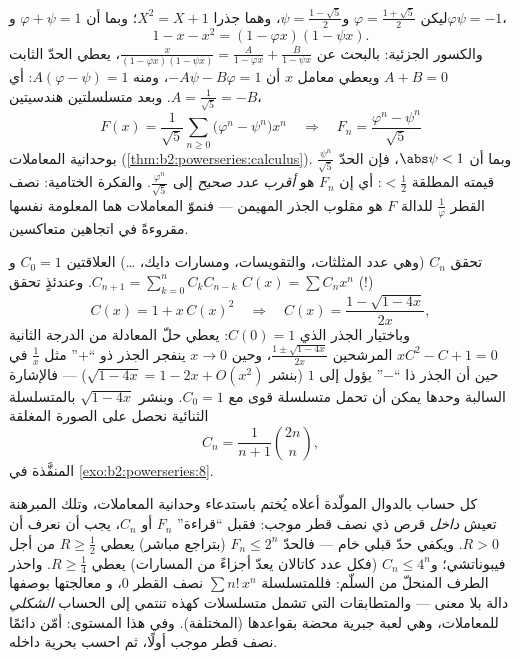 \begin{example}\label{ex:b2:powerseries:binet}
ليكن $\varphi = \frac{1+\sqrt5}{2}$ و$\psi =
\frac{1-\sqrt5}{2}$، وهما جذرا $X^2 = X + 1$؛ وبما أن $\varphi
+ \psi = 1$ و$\varphi\psi = -1$،
\[
1 - x - x^2 = (1 - \varphi x)(1 - \psi x) .
\]
والكسور الجزئية: بالبحث عن $\frac{x}{(1-\varphi x)(1-\psi x)} =
\frac{A}{1 - \varphi x} + \frac{B}{1 - \psi x}$، يعطي الحدّ
الثابت $A + B = 0$ ويعطي معامل $x$ أن $-A\psi - B\varphi
= 1$، ومنه $A(\varphi - \psi) = 1$: أي $A = \frac{1}{\sqrt5} = -B$.
وبعد متسلسلتين هندسيتين،
\[
F(x) = \frac{1}{\sqrt5}\sum_{n\geq0}
\bigl(\varphi^n - \psi^n\bigr)x^n
\quad\Longrightarrow\quad
F_n = \frac{\varphi^n - \psi^n}{\sqrt5}
\]
بوحدانية المعاملات
(\cref{thm:b2:powerseries:calculus}). وبما أن $\abs\psi < 1$، فإن
الحدّ $\frac{\psi^n}{\sqrt5}$ قيمته المطلقة $< \frac12$:
أي إن $F_n$ هو \emph{أقرب عدد صحيح} إلى
$\frac{\varphi^n}{\sqrt5}$. والفكرة الختامية: نصف القطر
$\frac1\varphi$ للدالة $F$ هو مقلوب الجذر المهيمن
--- فنموّ المعاملات  هما المعلومة
نفسها مقروءةً في اتجاهين متعاكسين.
\end{example}

\begin{example}\label{ex:b2:powerseries:catalan}
تحقق  $C_n$ (وهي عدد المثلثات، والتقويسات،
ومسارات دايك، \dots) العلاقتين $C_0 = 1$ و$C_{n+1} = \sum_{k=0}^n
C_kC_{n-k}$. وعندئذٍ تحقق  $C(x) = \sum C_nx^n$
(!)
\[
C(x) = 1 + x\,C(x)^2
\quad\Longrightarrow\quad
C(x) = \frac{1 - \sqrt{1 - 4x}}{2x} ,
\]
وباختيار الجذر الذي $C(0) = 1$: يعطي حلّ المعادلة من الدرجة الثانية
$xC^2 - C + 1 = 0$ المرشحين $\frac{1 \pm
\sqrt{1-4x}}{2x}$، وحين $x \to 0$ ينفجر الجذر ذو ``$+$''
مثل $\frac1x$ في حين أن الجذر ذا ``$-$'' يؤول إلى $1$ (بنشر
$\sqrt{1-4x} = 1 - 2x + O(x^2)$) --- فالإشارة السالبة وحدها يمكن أن
تحمل متسلسلة قوى مع $C_0 = 1$. وبنشر $\sqrt{1 - 4x}$
بالمتسلسلة الثنائية نحصل على الصورة المغلقة
\[
C_n = \frac{1}{n+1}\binom{2n}{n} ,
\]
المنفَّذة في \cref{exo:b2:powerseries:8}.
\end{example}

\begin{remark}
كل حساب بالدوال المولّدة أعلاه يُختم باستدعاء
وحدانية المعاملات، وتلك المبرهنة تعيش
\emph{داخل} قرص ذي نصف قطر موجب: فقبل ``قراءة''
$F_n$ أو $C_n$، يجب أن نعرف أن $R > 0$. ويكفي حدّ قبلي خام
--- فالحدّ $F_n \leq 2^n$ (بتراجع مباشر) يعطي $R \geq
\frac12$ من أجل فيبوناتشي؛ و$C_n \leq 4^n$ (فكل عدد كاتالان
يعدّ أجزاءً من المسارات) يعطي $R \geq \frac14$. واحذر
الطرف المنحلّ من السلّم: فللمتسلسلة $\sum n!\,x^n$ نصف القطر $0$، و
معالجتها بوصفها دالة بلا معنى --- والمتطابقات
التي تشمل متسلسلات كهذه تنتمي إلى الحساب \emph{الشكلي}
للمعاملات، وهي لعبة جبرية محضة بقواعدها (المختلفة).
وفي هذا المستوى: أمّن دائمًا نصف قطر موجب أولًا،
ثم احسب بحرية داخله.
\end{remark}

